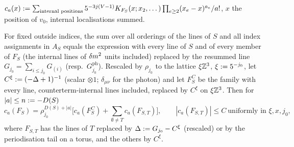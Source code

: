 $c_a(x):=\sum_{\text{internal positions}}5^{-3j(V-1)}K_{F_S}(x;x_2,\dots)\prod_{e\ge2}(x_e-x)^{a_e}/a!$, $x$ the position of $v_0$, internal localisations summed.

\begin{lemma}[resummation]\label{lem:a02:RS}
For fixed outside indices, the sum over all orderings of the lines of $S$ and all index assignments in $A_S$ equals the expression with every line of $S$ and of every member of $F_S$ (the internal lines of $\delta m^2$ units included) replaced by the resummed line $G_{j_0}=\sum_{i\le j_0}G_{(i)}$ (resp.\ $G^{\mathrm{ph}}_{j_0}$). Rescaled by $\rho_{j_0}$ to the lattice $\xi\mathbb Z^3$, $\xi:=5^{-j_0}$, let $C^\xi:=(-\Delta+1)^{-1}$ (scalar $\otimes1$; $\delta_{\mu\nu}$ for the photon) and let $F^C_S$ be the family with every line, counterterm-internal lines included, replaced by $C^\xi$ on $\xi\mathbb Z^3$. Then for $|a|\le n:=-D(S)$
\[
c_a(F_S)=\rho_{j_0}^{D(S)+|a|}\Big[c_a(F^C_S)+\sum_{\emptyset\ne T}c_a(F_{S,T})\Big],\qquad|c_a(F_{S,T})|\le C\ \text{uniformly in }\xi,x,j_0,
\]
where $F_{S,T}$ has the lines of $T$ replaced by $\Delta:= G_{j_0}-C^\xi$ (rescaled) or by the periodisation tail on a torus, and the others by $C^\xi$.
\end{lemma}
